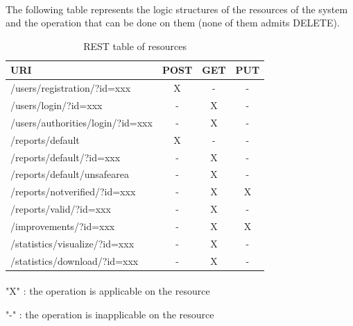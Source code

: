 					\paragraph{}
						The following table represents the logic structures of the resources of the system and the operation that can be done on them (none of them admits DELETE).
						\begin{table}[!h]
							\centering
							\begin{tabular}{L{0.5\textwidth}ccc}
								\toprule
								\textbf{URI}	& \textbf{POST} & \textbf{GET} & \textbf{PUT} \\
								\midrule
								{\ttfamily /users/registration/?id=xxx} & X & - & - \\
								{\ttfamily /users/login/?id=xxx} & - & X & - \\
								{\ttfamily /users/authorities/login/?id=xxx} & - & X & - \\
								{\ttfamily /reports/default} & X & - & - \\
								{\ttfamily /reports/default/?id=xxx} & - & X & - \\
								{\ttfamily /reports/default/unsafearea} & - & X & - \\
								{\ttfamily /reports/notverified/?id=xxx} & - & X & X \\
								{\ttfamily /reports/valid/?id=xxx} & - & X & - \\
								{\ttfamily /improvements/?id=xxx} & - & X & X \\
								{\ttfamily /statistics/visualize/?id=xxx} & - & X & - \\
								{\ttfamily /statistics/download/?id=xxx} & - & X & - \\
							\end{tabular}
							\caption{REST table of resources}
						\end{table}
					\paragraph{}
						"X" : the operation is applicable on the resource
						
						"-" : the operation is inapplicable on the resource
					\clearpage
